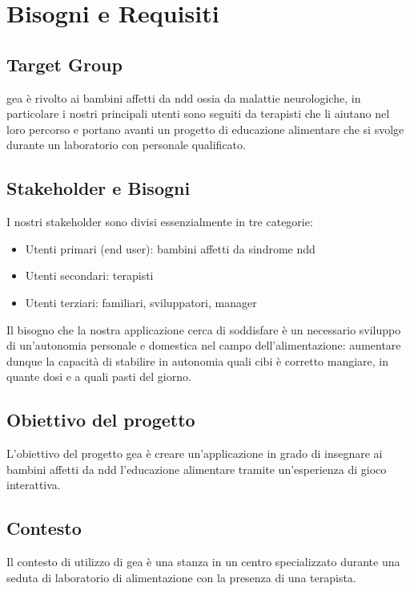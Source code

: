 \section{Bisogni e Requisiti} \label{sec:biso}

\subsection{Target Group} \label{subsec:target}
\acs{gea} è rivolto ai bambini affetti da \acs{ndd} ossia da malattie neurologiche, in particolare i nostri principali utenti sono seguiti da terapisti che li aiutano nel loro percorso e portano avanti un progetto di educazione alimentare che si svolge durante un laboratorio con personale qualificato.

\subsection{Stakeholder e Bisogni} \label{subsec:stakbis}
I nostri stakeholder sono divisi essenzialmente in tre categorie:
\begin{itemize}
\item Utenti primari (end user): bambini affetti da sindrome \acs{ndd}
\item Utenti secondari: terapisti
\item Utenti terziari: familiari, sviluppatori, manager
\end{itemize}
Il bisogno che la nostra applicazione cerca di soddisfare è un necessario sviluppo di un'autonomia personale e domestica nel campo dell'alimentazione: aumentare dunque la capacità di stabilire in autonomia quali cibi è corretto mangiare, in quante dosi e a quali pasti del giorno.


\subsection{Obiettivo del progetto} \label{subsec:obiettivo}
L'obiettivo del progetto \acs{gea} è creare un'applicazione in grado di insegnare ai bambini affetti da \acs{ndd} l'educazione alimentare tramite un'esperienza di gioco interattiva.


\subsection{Contesto} \label{subsec:contesto}
Il contesto di utilizzo di \acs{gea} è una stanza in un centro specializzato durante una seduta di laboratorio di alimentazione con la presenza di una terapista.


